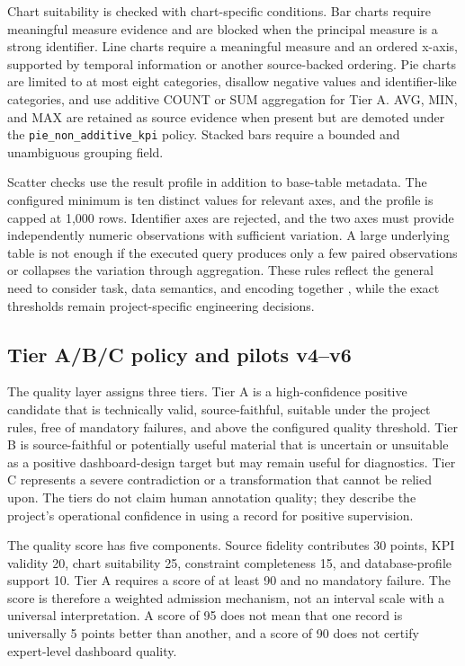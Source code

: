 Chart suitability is checked with chart-specific conditions. Bar charts require meaningful measure evidence and are blocked when the principal measure is a strong identifier. Line charts require a meaningful measure and an ordered x-axis, supported by temporal information or another source-backed ordering. Pie charts are limited to at most eight categories, disallow negative values and identifier-like categories, and use additive COUNT or SUM aggregation for Tier A. AVG, MIN, and MAX are retained as source evidence when present but are demoted under the \texttt{pie\_non\_additive\_kpi} policy. Stacked bars require a bounded and unambiguous grouping field.

Scatter checks use the result profile in addition to base-table metadata. The configured minimum is ten distinct values for relevant axes, and the profile is capped at 1,000 rows. Identifier axes are rejected, and the two axes must provide independently numeric observations with sufficient variation. A large underlying table is not enough if the executed query produces only a few paired observations or collapses the variation through aggregation. These rules reflect the general need to consider task, data semantics, and encoding together \cite{cleveland1984graphical,mackinlay1986apt,brehmer2013typology}, while the exact thresholds remain project-specific engineering decisions.

\subsection{Tier A/B/C policy and pilots v4--v6}

The quality layer assigns three tiers. Tier A is a high-confidence positive candidate that is technically valid, source-faithful, suitable under the project rules, free of mandatory failures, and above the configured quality threshold. Tier B is source-faithful or potentially useful material that is uncertain or unsuitable as a positive dashboard-design target but may remain useful for diagnostics. Tier C represents a severe contradiction or a transformation that cannot be relied upon. The tiers do not claim human annotation quality; they describe the project's operational confidence in using a record for positive supervision.

The quality score has five components. Source fidelity contributes 30 points, KPI validity 20, chart suitability 25, constraint completeness 15, and database-profile support 10. Tier A requires a score of at least 90 and no mandatory failure. The score is therefore a weighted admission mechanism, not an interval scale with a universal interpretation. A score of 95 does not mean that one record is universally 5 points better than another, and a score of 90 does not certify expert-level dashboard quality.


